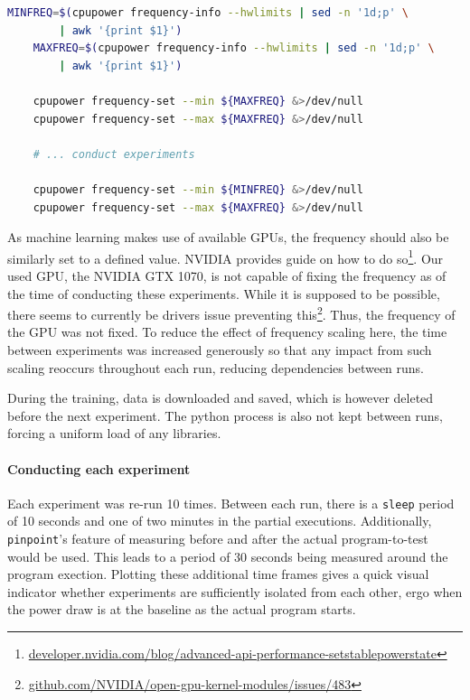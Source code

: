 \begin{lstlisting}[language=bash, frame=single, numbers=none, caption={Used operating system information}, basicstyle=\ttfamily]
    MINFREQ=$(cpupower frequency-info --hwlimits | sed -n '1d;p' \
        | awk '{print $1}')
    MAXFREQ=$(cpupower frequency-info --hwlimits | sed -n '1d;p' \
        | awk '{print $1}')
    
    cpupower frequency-set --min ${MAXFREQ} &>/dev/null
    cpupower frequency-set --max ${MAXFREQ} &>/dev/null

    # ... conduct experiments

    cpupower frequency-set --min ${MINFREQ} &>/dev/null
    cpupower frequency-set --max ${MAXFREQ} &>/dev/null
\end{lstlisting}
\label{listing:setting_cpu_frequency}

As machine learning makes use of available GPUs, the frequency should also be similarly set to a defined value. 
NVIDIA provides guide on how to do so\footnote{\url{developer.nvidia.com/blog/advanced-api-performance-setstablepowerstate}}.
Our used GPU, the NVIDIA GTX 1070, is not capable of fixing the frequency as of the time of conducting these experiments. 
While it is supposed to be possible, there seems to currently be drivers issue preventing this\footnote{\url{github.com/NVIDIA/open-gpu-kernel-modules/issues/483}}. 
Thus, the frequency of the GPU was not fixed. 
To reduce the effect of frequency scaling here, the time between experiments was increased generously so that any impact from such scaling reoccurs throughout each run, reducing dependencies between runs.

During the training, data is downloaded and saved, which is however deleted before the next experiment. 
The python process is also not kept between runs, forcing a uniform load of any libraries.

\paragraph{Conducting each experiment}

Each experiment was re-run 10 times. Between each run, there is a \verb|sleep| period of 10 seconds and one of two minutes in the partial executions. 
Additionally, \verb|pinpoint|'s feature of measuring before and after the actual program-to-test would be used. 
This leads to a period of 30 seconds being measured around the program exection. 
Plotting these additional time frames gives a quick visual indicator whether experiments are sufficiently isolated from each other, ergo when the power draw is at the baseline as the actual program starts.

